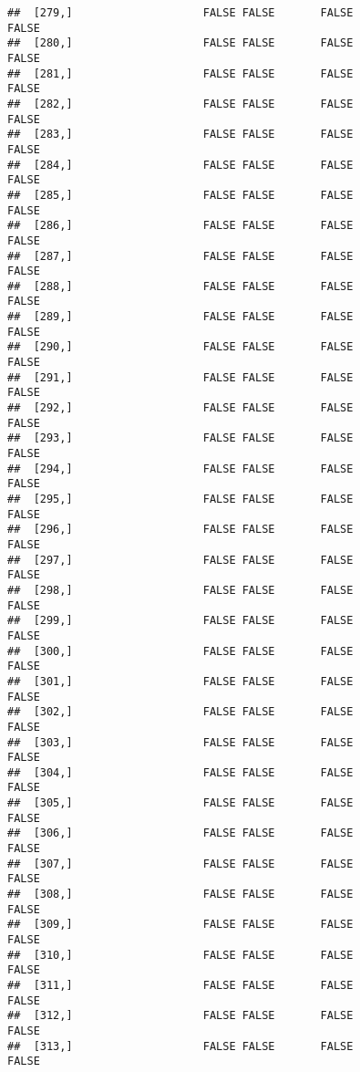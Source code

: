 \documentclass[
]{article}
\begin{document}
\begin{verbatim}
##  [279,]                    FALSE FALSE       FALSE                FALSE
##  [280,]                    FALSE FALSE       FALSE                FALSE
##  [281,]                    FALSE FALSE       FALSE                FALSE
##  [282,]                    FALSE FALSE       FALSE                FALSE
##  [283,]                    FALSE FALSE       FALSE                FALSE
##  [284,]                    FALSE FALSE       FALSE                FALSE
##  [285,]                    FALSE FALSE       FALSE                FALSE
##  [286,]                    FALSE FALSE       FALSE                FALSE
##  [287,]                    FALSE FALSE       FALSE                FALSE
##  [288,]                    FALSE FALSE       FALSE                FALSE
##  [289,]                    FALSE FALSE       FALSE                FALSE
##  [290,]                    FALSE FALSE       FALSE                FALSE
##  [291,]                    FALSE FALSE       FALSE                FALSE
##  [292,]                    FALSE FALSE       FALSE                FALSE
##  [293,]                    FALSE FALSE       FALSE                FALSE
##  [294,]                    FALSE FALSE       FALSE                FALSE
##  [295,]                    FALSE FALSE       FALSE                FALSE
##  [296,]                    FALSE FALSE       FALSE                FALSE
##  [297,]                    FALSE FALSE       FALSE                FALSE
##  [298,]                    FALSE FALSE       FALSE                FALSE
##  [299,]                    FALSE FALSE       FALSE                FALSE
##  [300,]                    FALSE FALSE       FALSE                FALSE
##  [301,]                    FALSE FALSE       FALSE                FALSE
##  [302,]                    FALSE FALSE       FALSE                FALSE
##  [303,]                    FALSE FALSE       FALSE                FALSE
##  [304,]                    FALSE FALSE       FALSE                FALSE
##  [305,]                    FALSE FALSE       FALSE                FALSE
##  [306,]                    FALSE FALSE       FALSE                FALSE
##  [307,]                    FALSE FALSE       FALSE                FALSE
##  [308,]                    FALSE FALSE       FALSE                FALSE
##  [309,]                    FALSE FALSE       FALSE                FALSE
##  [310,]                    FALSE FALSE       FALSE                FALSE
##  [311,]                    FALSE FALSE       FALSE                FALSE
##  [312,]                    FALSE FALSE       FALSE                FALSE
##  [313,]                    FALSE FALSE       FALSE                FALSE

\end{verbatim}
\end{document}
